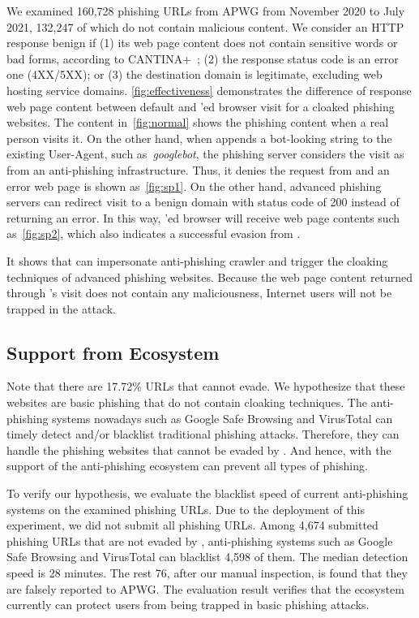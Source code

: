 We examined 160,728 phishing URLs from APWG from November 2020 to July 2021,
132,247 of which do not contain malicious content.
We consider an HTTP response benign if (1) its web page content does not contain sensitive words or bad forms, according to CANTINA+~\cite{xiang2011cantina+};
(2) the response status code is an error one (4XX/5XX);
or (3) the destination domain is legitimate, excluding web hosting service domains.
\autoref{fig:effectiveness} demonstrates the difference of response web page content between default and \spartacus'ed browser visit for a cloaked phishing websites.
The content in~\autoref{fig:normal} shows the phishing content when a real person visits it.
On the other hand, when \spartacus appends a bot-looking string to the existing User-Agent, such as~\emph{googlebot}, the phishing server considers the visit as from an anti-phishing infrastructure.
Thus, it denies the request from \spartacus and an error web page is shown as~\autoref{fig:sp1}.
On the other hand, advanced phishing servers can redirect visit to a benign domain with status code of 200 instead of returning an error.
In this way, \spartacus'ed browser will receive web page contents such as~\autoref{fig:sp2},
which also indicates a successful evasion 
from \spartacus.

It shows that \spartacus can impersonate anti-phishing crawler and trigger the cloaking techniques of advanced phishing websites.
Because the web page content returned through \spartacus's visit does not contain any maliciousness, Internet users will not be trapped in the attack.


\subsection{Support from Ecosystem}

Note that there are 17.72\% URLs that \spartacus cannot evade.
We hypothesize that these websites are basic phishing that do not contain cloaking techniques.
The anti-phishing systems nowadays such as Google Safe Browsing and VirusTotal can timely detect and/or blacklist traditional phishing attacks.
Therefore, they can handle the phishing websites that cannot be evaded by \spartacus.
And hence, \spartacus with the support of the anti-phishing ecosystem can prevent all types of phishing.

To verify our hypothesis, we evaluate the blacklist speed of current anti-phishing systems on the examined phishing URLs.
Due to the deployment of this experiment, we did not submit all phishing URLs.
Among 4,674 submitted phishing URLs that are not evaded by \spartacus, anti-phishing systems such as Google Safe Browsing and VirusTotal can blacklist 4,598 of them.
The median detection speed is 28 minutes.
The rest 76, after our manual inspection, is found that they are falsely reported to APWG.
The evaluation result verifies that the ecosystem currently can protect users from being trapped in basic phishing attacks.

